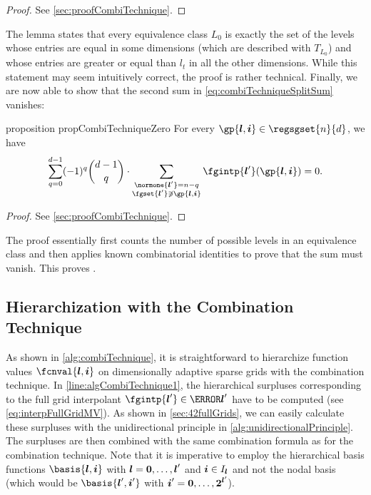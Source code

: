 \begin{proof}
  See \cref{sec:proofCombiTechnique}.
\end{proof}

The lemma states that every equivalence class $L_0$ is exactly the
set of the levels whose entries are equal in some dimensions
(which are described with $T_{L_0}$)
and whose entries are greater or equal than $l_t$ in all the other dimensions.
While this statement may seem intuitively correct,
the proof is rather technical.
Finally, we are now able to show that the second sum in
\eqref{eq:combiTechniqueSplitSum} vanishes:

\begin{restatable}{%
  proposition%
}{%
  propCombiTechniqueZero%
}
  \label{prop:combiTechniqueZero}
  For every $\gp{\*l,\*i} \in \regsgset{n}{d}$, we have
  \begin{equation}
    \sum_{q=0}^{d-1} (-1)^q \binom{d-1}{q} \cdot
    \sum_{\substack{\normone{\*l'} = n - q\\\fgset{\*l'} \notni \gp{\*l,\*i}}}
    \fgintp{\*l'}(\gp{\*l,\*i})
    = 0.
  \end{equation}
\end{restatable}

\begin{proof}
  See \cref{sec:proofCombiTechnique}.
\end{proof}

The proof essentially first counts the number of possible levels in
an equivalence class and then applies known combinatorial identities
to prove that the sum must vanish.
This proves .



\subsection{Hierarchization with the Combination Technique}
\label{sec:432hierarchizationCombiTechnique}

As shown in \cref{alg:combiTechnique},
it is straightforward to hierarchize function values
$\fcnval{\*l,\*i}$ on dimensionally adaptive sparse grids
with the combination technique.
In \cref{line:algCombiTechnique1},
the hierarchical surpluses corresponding to the full grid
interpolant $\fgintp{\*l'} \in \ns{\*l'}$ have to be computed
(see \eqref{eq:interpFullGridMV}).
As shown in \cref{sec:42fullGrids}, we can easily calculate these
surpluses with the unidirectional principle in
\cref{alg:unidirectionalPrinciple}.
The surpluses are then combined with the same combination formula
as for the combination technique.
Note that it is imperative to employ the hierarchical basis functions
$\basis{\*l,\*i}$ with ${\boldsymbol{l}} = {\boldsymbol{0}}, \dotsc, {\boldsymbol{l}}'$ and ${\boldsymbol{i}} \in I_{{\boldsymbol{l}}}$
and not the nodal basis
(which would be $\basis{\*l',\*i'}$ with ${\boldsymbol{i}}' = {\boldsymbol{0}}, \dotsc, {\boldsymbol{2}}^{{\boldsymbol{l}}'}$).

